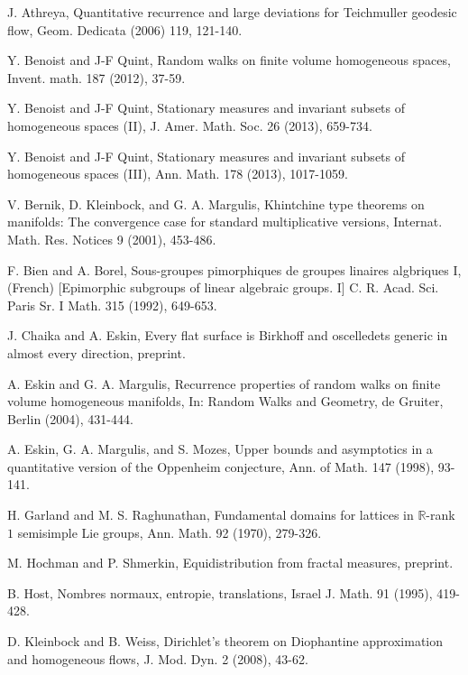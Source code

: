 \documentclass[12pt]{amsart}
\theoremstyle{definition}
\theoremstyle{remark}
\numberwithin{equation}{section}
\begin{document}
\begin{thebibliography}{99}

J. Athreya, 
Quantitative recurrence and large deviations
for Teichmuller geodesic flow, Geom. Dedicata (2006) 119, 121-140. 

Y. Benoist and J-F Quint, Random walks on finite volume homogeneous spaces, Invent. math. 
187 (2012), 37-59.

Y. Benoist and J-F Quint, Stationary measures and invariant subsets of homogeneous spaces (II), 
J. Amer. Math. Soc. 26 (2013), 659-734.

Y. Benoist and J-F Quint, Stationary measures and invariant subsets of homogeneous spaces (III),
Ann. Math. 178 (2013), 1017-1059. 

V. Bernik, D. Kleinbock, and G. A.  Margulis, Khintchine type theorems on manifolds: The convergence case 
for standard multiplicative versions, Internat. Math. Res. Notices 9 (2001), 453-486.

F. Bien and A. Borel,
Sous-groupes pimorphiques de groupes linaires algbriques  I, (French) [Epimorphic subgroups of linear algebraic groups. I] C. R. Acad. Sci. Paris Sr. I Math. 315 (1992), 649-653.

J. Chaika and A. Eskin, Every flat surface is Birkhoff and oscelledets 
generic in almost every direction, preprint. 

A. Eskin and G. A.  Margulis, Recurrence properties of random walks on finite volume homogeneous
manifolds,  In: Random Walks and Geometry, de Gruiter, Berlin
(2004),  431-444. 

A. Eskin, G. A. Margulis,  and S. Mozes, Upper bounds and asymptotics in a quantitative version of the 
Oppenheim conjecture, Ann. of Math. 147 (1998), 93-141.

H. Garland and M. S. Raghunathan, Fundamental domains for lattices in $\mathbb R$-rank $1$ semisimple 
Lie groups, Ann. Math. 92 (1970), 279-326.

M. Hochman and P. Shmerkin, Equidistribution from fractal measures, preprint.

B. Host, 
 Nombres normaux, entropie, translations,  Israel J. Math. 91 (1995), 419-428.

D.  Kleinbock and B. Weiss,  Dirichlet's theorem on Diophantine approximation and homogeneous flows,
 J. Mod. Dyn. 2 (2008), 43-62.


\end{thebibliography}
\end{document}
